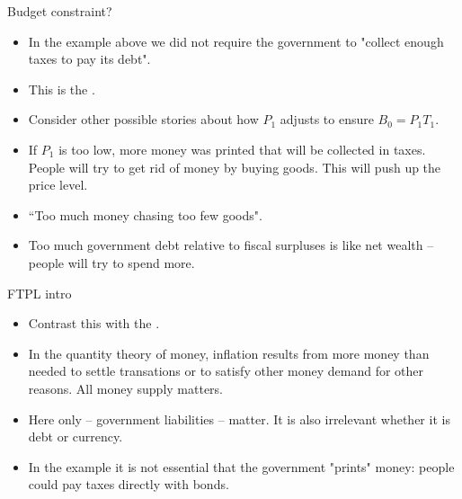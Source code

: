 \documentclass[11pt,xcolor={dvipsnames},aspectratio=159,hyperref={pdftex,pdfpagemode=UseNone,hidelinks,pdfdisplaydoctitle=true},usepdftitle=false]{beamer}
\begin{document}
\begin{frame}{Budget constraint?}
    \begin{itemize}
            \item In the example above we did not require the government to "collect enough taxes to pay its debt".
            \item This is the .
            \item Consider other possible stories about how $P_1$ adjusts to ensure $B_0 = P_1 T_1$.
            \item If $P_1$ is too low, more money was printed that will be collected in taxes. People will try to get rid of money by buying goods. This will push up the price level. 
            \item ``Too much money chasing too few goods".
            \item Too much government debt relative to fiscal surpluses is like net wealth -- people will try to spend more. 
        \end{itemize}
    \end{frame}
  
    
\begin{frame}{FTPL intro}
    \begin{itemize}
            \item Contrast this with the .
            \item In the quantity theory of money, inflation results from more money than needed to settle transations or to satisfy other money demand for other reasons. All money supply matters. 
            \item Here only  -- government liabilities -- matter. It is also irrelevant whether it is debt or currency. 
            \item In the example it is not essential that the government "prints" money: people could pay taxes directly with bonds. 
        \end{itemize}
    \end{frame}
\end{document}
